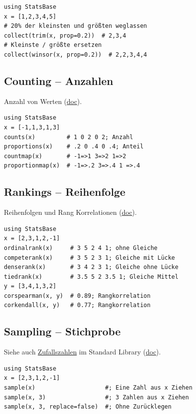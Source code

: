 \documentclass[10pt,twocolumn]{scrartcl}
\begin{document}
\begin{lstlisting}
using StatsBase
x = [1,2,3,4,5]
# 20% der kleinsten und größten weglassen
collect(trim(x, prop=0.2))  # 2,3,4
# Kleinste / größte ersetzen
collect(winsor(x, prop=0.2))  # 2,2,3,4,4
\end{lstlisting}

\subsection{Counting -- Anzahlen}

Anzahl von Werten
(\href{https://juliastats.org/StatsBase.jl/stable/counts/}{doc}).

\begin{lstlisting}
using StatsBase
x = [-1,1,3,1,3]
counts(x)         # 1 0 2 0 2; Anzahl
proportions(x)    # .2 0 .4 0 .4; Anteil
countmap(x)       # -1=>1 3=>2 1=>2
proportionmap(x)  # -1=>.2 3=>.4 1 =>.4
\end{lstlisting}

\subsection{Rankings -- Reihenfolge}

Reihenfolgen und Rang Korrelationen
(\href{https://juliastats.org/StatsBase.jl/stable/ranking/}{doc}).

\begin{lstlisting}
using StatsBase
x = [2,3,1,2,-1]
ordinalrank(x)     # 3 5 2 4 1; ohne Gleiche
competerank(x)     # 3 5 2 3 1; Gleiche mit Lücke
denserank(x)       # 3 4 2 3 1; Gleiche ohne Lücke
tiedrank(x)        # 3.5 5 2 3.5 1; Gleiche Mittel
y = [3,4,1,3,2]
corspearman(x, y)  # 0.89; Rangkorrelation
corkendall(x, y)   # 0.77; Rangkorrelation
\end{lstlisting}

\subsection{Sampling -- Stichprobe}
\label{ssec:StatsBase_Sampling}

Siehe auch \hyperref[ssec:standardLibrary_Random]{Zufallszahlen} im Standard
Library (\href{https://juliastats.org/StatsBase.jl/stable/sampling/}{doc}).

\begin{lstlisting}
using StatsBase
x = [2,3,1,2,-1]
sample(x)                    #; Eine Zahl aus x Ziehen
sample(x, 3)                 #; 3 Zahlen aus x Ziehen
sample(x, 3, replace=false)  #; Ohne Zurücklegen
\end{lstlisting}
\end{document}

